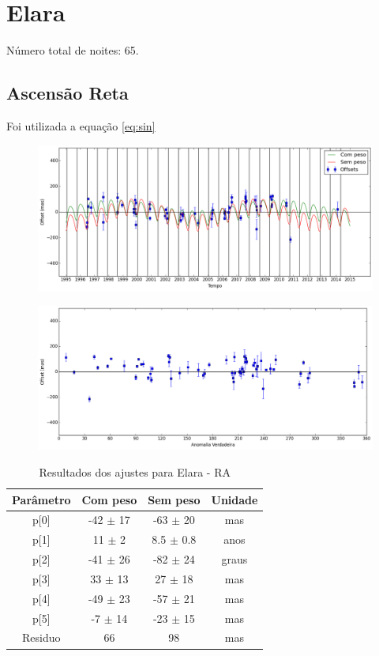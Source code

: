 \documentclass[11pt,a4paper]{report}
\begin{document}
\chapter*{Elara}

\indent \indent Número total de noites: 65.

\section*{Ascensão Reta}

Foi utilizada a equação \ref{eq:sin}

\begin{figure}[h]
\includegraphics[scale=0.45]{Elara/RA.png} 
\end{figure}

\begin{figure}[h]
\includegraphics[scale=0.45]{Elara/RA_anom.png}  
\end{figure}

\begin{table}[h!]
\caption{\label{Tab: Elara-RA} Resultados dos ajustes para Elara - RA}
\begin{centering}
\begin{tabular}{cccc}
\hline
\hline
Parâmetro & Com peso & Sem peso & Unidade\tabularnewline
\hline
p[0] & -42 $\pm$ 17 & -63 $\pm$ 20 & mas\\
p[1] & 11 $\pm$ 2 & 8.5 $\pm$ 0.8 & anos\\
p[2] & -41 $\pm$ 26 & -82 $\pm$ 24 & graus\\
p[3] & 33 $\pm$ 13 & 27 $\pm$ 18 & mas\\
p[4] & -49 $\pm$ 23 & -57 $\pm$ 21 & mas\\
p[5] & -7 $\pm$ 14 & -23 $\pm$ 15 & mas\\
Residuo & 66 & 98 & mas\\
\hline 
\end{tabular} 
\par\end{centering}
\end{table}
\end{document}

